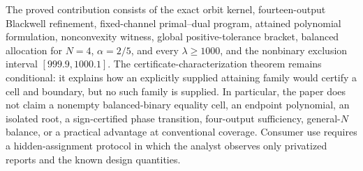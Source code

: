 \documentclass{article}
\begin{document}
The proved contribution consists of the exact orbit kernel, fourteen-output Blackwell refinement, fixed-channel primal--dual program, attained polynomial formulation, nonconvexity witness, global positive-tolerance bracket, balanced allocation for \(N=4\), \(\alpha=2/5\), and every \(\lambda\ge1000\), and the nonbinary exclusion interval \([999.9,1000.1]\). The certificate-characterization theorem remains conditional: it explains how an explicitly supplied attaining family would certify a cell and boundary, but no such family is supplied. In particular, the paper does not claim a nonempty balanced-binary equality cell, an endpoint polynomial, an isolated root, a sign-certified phase transition, four-output sufficiency, general-\(N\) balance, or a practical advantage at conventional coverage. Consumer use requires a hidden-assignment protocol in which the analyst observes only privatized reports and the known design quantities.
\end{document}
